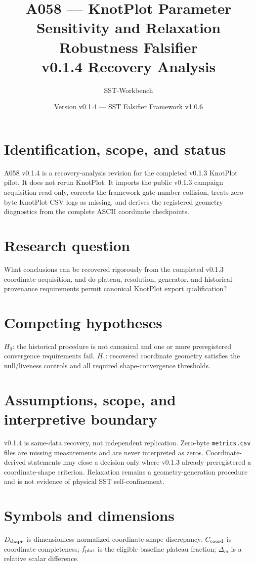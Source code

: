 \documentclass[11pt,a4paper]{article}
\title{A058 --- KnotPlot Parameter Sensitivity and Relaxation Robustness Falsifier\\v0.1.4 Recovery Analysis}
\author{SST-Workbench}\date{Version v0.1.4 --- SST Falsifier Framework v1.0.6}
\newcommand{\code}[1]{\texttt{#1}}
\begin{document}
\maketitle\sloppy
\section{Identification, scope, and status}
A058 v0.1.4 is a recovery-analysis revision for the completed v0.1.3 KnotPlot pilot. It does not rerun KnotPlot. It imports the public v0.1.3 campaign acquisition read-only, corrects the framework gate-number collision, treats zero-byte KnotPlot CSV logs as missing, and derives the registered geometry diagnostics from the complete ASCII coordinate checkpoints.
\section{Research question}
What conclusions can be recovered rigorously from the completed v0.1.3 coordinate acquisition, and do plateau, resolution, generator, and historical-provenance requirements permit canonical KnotPlot export qualification?
\section{Competing hypotheses}
$H_0$: the historical procedure is not canonical and one or more preregistered convergence requirements fail. $H_1$: recovered coordinate geometry satisfies the null/liveness controls and all required shape-convergence thresholds.
\section{Assumptions, scope, and interpretive boundary}
v0.1.4 is same-data recovery, not independent replication. Zero-byte \code{metrics.csv} files are missing measurements and are never interpreted as zeros. Coordinate-derived statements may close a decision only where v0.1.3 already preregistered a coordinate-shape criterion. Relaxation remains a geometry-generation procedure and is not evidence of physical SST self-confinement.
\section{Symbols and dimensions}
$D_{\rm shape}$ is dimensionless normalized coordinate-shape discrepancy; $C_{\rm coord}$ is coordinate completeness; $f_{\rm plat}$ is the eligible-baseline plateau fraction; $\Delta_m$ is a relative scalar difference.
\end{document}
